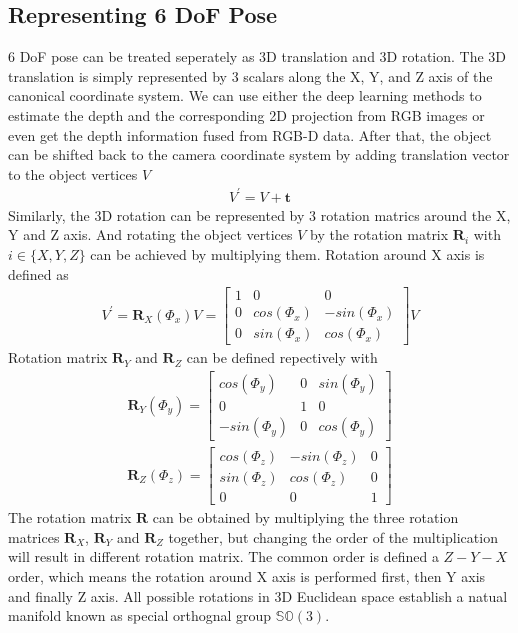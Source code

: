 \documentclass[12pt,DIV14,BCOR12mm,a4paper,footinclude=false,headinclude,parskip=half-,twoside,openright,cleardoublepage=empty,toc=index,bibliography=totoc,listof=totoc]{scrreprt}
\numberwithin{equation}{chapter}
\begin{document}
\subsection{Representing 6 DoF Pose}
6 DoF pose can be treated seperately as 3D translation and 3D rotation. 
The 3D translation is simply represented by 3 scalars along the X, Y, and Z axis of the canonical coordinate system. 
We can use either the deep learning methods to estimate the depth and the corresponding 2D projection from RGB images 
or even get the depth information fused from RGB-D data\cite{DBLP:journals/corr/abs-1711-00199}. 
After that, the object can be shifted back to the camera coordinate system by adding translation vector to the object vertices $V$
\begin{align}
  V^{'} = V + \textbf{t}
\end{align}
Similarly, the 3D rotation can be represented by 3 rotation matrics around the X, Y and Z axis. 
And rotating the object vertices $V$ by the rotation matrix $\textbf{R}_{i}$ with $i\in \{X,Y,Z\}$ can be achieved by multiplying them. 
Rotation around X axis is defined as
\begin{align}
  V^{'} = \textbf{R}_{X}(\Phi_{x})V = \begin{bmatrix}
    1 & 0 & 0 \\
    0 & cos(\Phi_{x}) & -sin(\Phi_{x}) \\
    0 & sin(\Phi_{x}) & cos(\Phi_{x})
  \end{bmatrix}V
\end{align}
Rotation matrix $\textbf{R}_{Y}$ and $\textbf{R}_{Z}$ can be defined repectively with
\begin{align}
  \textbf{R}_{Y}(\Phi_{y}) = \begin{bmatrix}
    cos(\Phi_{y}) & 0 & sin(\Phi_{y}) \\
    0 & 1 & 0 \\
    -sin(\Phi_{y}) & 0 & cos(\Phi_{y})
  \end{bmatrix}
\end{align}
\begin{align}
  \textbf{R}_{Z}(\Phi_{z}) = \begin{bmatrix}
    cos(\Phi_{z}) & -sin(\Phi_{z}) & 0 \\
    sin(\Phi_{z}) & cos(\Phi_{z}) & 0 \\
    0 & 0 & 1
  \end{bmatrix}
\end{align}
The rotation matrix $\textbf{R}$ can be obtained by multiplying the three rotation matrices $\textbf{R}_{X}$, $\textbf{R}_{Y}$ and $\textbf{R}_{Z}$ together, 
but changing the order of the multiplication will result in different rotation matrix. The common order is defined a $Z-Y-X$ order, 
which means the rotation around X axis is performed first, then Y axis and finally Z axis. All possible rotations in 3D Euclidean space establish 
a natual manifold known as special orthognal group $\mathbb{S} \mathbb{O} (3)$\cite{hashim2019special}.
\end{document}
